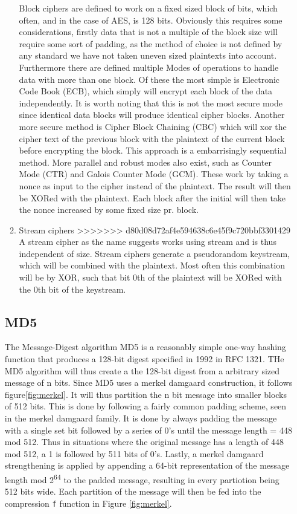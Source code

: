\documentclass[a4paper]{article}
\begin{document}
\begin{enumerate}
\begin{enumerate}
Block ciphers are defined to work on a fixed sized block of bits, which often, and in the case of AES, is 128 bits. Obviously this requires some considerations, firstly data that is not a multiple of the block size will require some sort of padding, as the method of choice is not defined by any standard we have not taken uneven sized plaintexts into account. Furthermore there are defined multiple Modes of operations to handle data with more than one block. Of these the most simple is Electronic Code Book (ECB), which simply will encrypt each block of the data independently. It is worth noting that this is not the most secure mode since identical data blocks will produce identical cipher blocks. Another more secure method is Cipher Block Chaining (CBC) which will xor the cipher text of the previous block with the plaintext of the current block before encrypting the block. This approach is a embarrisingly sequential method. More parallel and robust modes also exist, such as Counter Mode (CTR) and Galois Counter Mode (GCM). These work by taking a nonce as input to the cipher instead of the plaintext. The result will then be XORed with the plaintext. Each block after the initial will then take the nonce increased by some fixed size pr. block.
\item Stream ciphers
\label{sec:org01ffd3a}
>>>>>>> d80d08d72af4e594638c6e45f9c720bbf3301429
A stream cipher as the name suggests works using stream and is thus independent of size. Stream ciphers generate a pseudorandom keystream, which will be combined with the plaintext. Most often this combination will be by XOR, such that bit 0th of the plaintext will be XORed with the 0th bit of the keystream.
\end{enumerate}

\subsection{MD5}
\label{MD5alg}
The Message-Digest algorithm MD5 is a reasonably simple one-way hashing function that produces a 128-bit digest specified in 1992 in RFC 1321\cite{rfc1321}.
THe MD5 algorithm will  thus create a the 128-bit digest from a arbitrary sized message of n bits. Since MD5 uses a merkel damgaard construction, it follows figure\ref{fig:merkel}. It will thus partition the n bit message into smaller blocks of 512 bits. This is done by following a fairly common padding scheme, seen in the merkel damgaard family. It is done by always padding the message with a single set bit followed by a series of 0's until the message length = 448 mod 512. Thus in situations where the original message has a length of 448 mod 512, a 1 is followed by 511 bits of 0's. Lastly, a merkel damgaard strengthening is applied by appending a 64-bit representation of the message length mod 2\textsuperscript{64} to the padded message, resulting in every partiotion being 512 bits wide.
Each partition of the message will then be fed into the compression \texttt{f} function in Figure \ref{fig:merkel}.


\end{enumerate}
\end{document}
